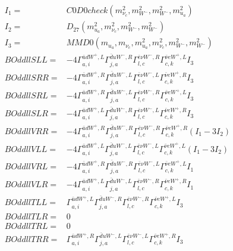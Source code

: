\documentclass[A4,landscape]{article}
\begin{document}
\begin{align} 
I_1 = & C0D0check(m^2_{\nu_{{c}}}, m^2_{W^-}, m^2_{W^-}, m^2_{u_{{a}}}) \\ 
I_2 = & D_{27}(m^2_{u_{{a}}}, m^2_{\nu_{{c}}}, m^2_{W^-}, m^2_{W^-}) \\ 
I_3 = & MMD0(m_{u_{{a}}}, m_{\nu_{{c}}}, m^2_{u_{{a}}}, m^2_{\nu_{{c}}}, m^2_{W^-}, m^2_{W^-}) \\ 
  BOddllSLL= & -4  \Gamma^{\bar{u}d W^+,L}_{a, i} \Gamma^{\bar{d}u W^- ,R}_{j, a} \Gamma^{\bar{e}\nu W^- ,R}_{l, c} \Gamma^{\bar{\nu}e W^+,L}_{c, k} I_3 \\ 
  BOddllSRR= & -4  \Gamma^{\bar{u}d W^+,R}_{a, i} \Gamma^{\bar{d}u W^- ,L}_{j, a} \Gamma^{\bar{e}\nu W^- ,L}_{l, c} \Gamma^{\bar{\nu}e W^+,R}_{c, k} I_3 \\ 
  BOddllSRL= & -4  \Gamma^{\bar{u}d W^+,R}_{a, i} \Gamma^{\bar{d}u W^- ,L}_{j, a} \Gamma^{\bar{e}\nu W^- ,R}_{l, c} \Gamma^{\bar{\nu}e W^+,L}_{c, k} I_3 \\ 
  BOddllSLR= & -4  \Gamma^{\bar{u}d W^+,L}_{a, i} \Gamma^{\bar{d}u W^- ,R}_{j, a} \Gamma^{\bar{e}\nu W^- ,L}_{l, c} \Gamma^{\bar{\nu}e W^+,R}_{c, k} I_3 \\ 
  BOddllVRR= & -4  \Gamma^{\bar{u}d W^+,R}_{a, i} \Gamma^{\bar{d}u W^- ,R}_{j, a} \Gamma^{\bar{e}\nu W^- ,R}_{l, c} \Gamma^{\bar{\nu}e W^+,R}_{c, k} (I_1 - 3 I_2) \\ 
  BOddllVLL= & -4  \Gamma^{\bar{u}d W^+,L}_{a, i} \Gamma^{\bar{d}u W^- ,L}_{j, a} \Gamma^{\bar{e}\nu W^- ,L}_{l, c} \Gamma^{\bar{\nu}e W^+,L}_{c, k} (I_1 - 3 I_2) \\ 
  BOddllVRL= & -4  \Gamma^{\bar{u}d W^+,R}_{a, i} \Gamma^{\bar{d}u W^- ,R}_{j, a} \Gamma^{\bar{e}\nu W^- ,L}_{l, c} \Gamma^{\bar{\nu}e W^+,L}_{c, k} I_1 \\ 
  BOddllVLR= & -4  \Gamma^{\bar{u}d W^+,L}_{a, i} \Gamma^{\bar{d}u W^- ,L}_{j, a} \Gamma^{\bar{e}\nu W^- ,R}_{l, c} \Gamma^{\bar{\nu}e W^+,R}_{c, k} I_1 \\ 
  BOddllTLL= &  \Gamma^{\bar{u}d W^+,L}_{a, i} \Gamma^{\bar{d}u W^- ,R}_{j, a} \Gamma^{\bar{e}\nu W^- ,R}_{l, c} \Gamma^{\bar{\nu}e W^+,L}_{c, k} I_3 \\ 
  BOddllTLR= & 0 \\ 
  BOddllTRL= & 0 \\ 
  BOddllTRR= &  \Gamma^{\bar{u}d W^+,R}_{a, i} \Gamma^{\bar{d}u W^- ,L}_{j, a} \Gamma^{\bar{e}\nu W^- ,L}_{l, c} \Gamma^{\bar{\nu}e W^+,R}_{c, k} I_3 \\ 
\end{align} 
\end{document}
